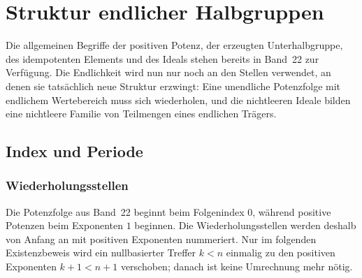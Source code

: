 \documentclass[main.tex]{subfiles}
\begin{document}
\chapter{Struktur endlicher Halbgruppen}

\ProofWideReasonsNearFormula

Die allgemeinen Begriffe der positiven Potenz, der erzeugten
Unterhalbgruppe, des idempotenten Elements und des Ideals stehen bereits in
Band~22 zur Verfügung.  Die Endlichkeit wird nun nur noch an den Stellen
verwendet, an denen sie tatsächlich neue Struktur erzwingt: Eine unendliche
Potenzfolge mit endlichem Wertebereich muss sich wiederholen, und die
nichtleeren Ideale bilden eine nichtleere Familie von Teilmengen eines
endlichen Trägers.

\section{Index und Periode}

\subsection{Wiederholungsstellen}

Die Potenzfolge aus Band~22 beginnt beim Folgenindex \(0\), während positive
Potenzen beim Exponenten \(1\) beginnen.  Die Wiederholungsstellen werden
deshalb von Anfang an mit positiven Exponenten nummeriert.  Nur im folgenden
Existenzbeweis wird ein nullbasierter Treffer \(k<n\) einmalig zu den
positiven Exponenten \(k+1<n+1\) verschoben; danach ist keine Umrechnung mehr
nötig.

\end{document}
